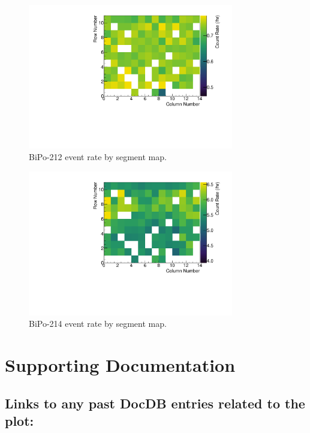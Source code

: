 \begin{figure}[!bp]
	\centering
	\includegraphics[width=0.8\textwidth]{figures/BiPo1HeatMap.pdf}
	\caption{\label{fig:bipo212heatmap}BiPo-212 event rate by segment map.}
\end{figure}

\begin{figure}[!bp]
	\centering
	\includegraphics[width=0.8\textwidth]{figures/BiPo0HeatMap.pdf}
	\caption{\label{fig:bipo214heatmap}BiPo-214 event rate by segment map.}
\end{figure}
\clearpage
\newpage

\section{Supporting Documentation}

\subsection{Links to any past DocDB entries related to the plot:} 
\hspace{2in}
%
{}

